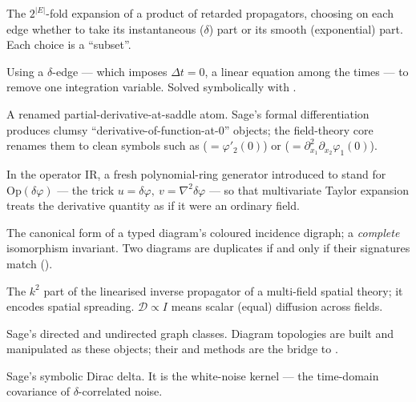 \begin{description}[leftmargin=0pt,style=nextline]
  \item[$\delta$-edge / smooth-edge subset] The $2^{|E|}$-fold expansion of a
        product of retarded propagators, choosing on each edge whether to take its
        instantaneous ($\delta$) part or its smooth (exponential) part. Each choice
        is a ``subset''.

  \item[$\delta$-elimination] Using a $\delta$-edge --- which imposes $\Delta t=0$,
        a linear equation among the times --- to remove one integration variable.
        Solved symbolically with .

  \item[Derivative symbol] A renamed partial-derivative-at-saddle atom. Sage's
        formal differentiation produces clumsy ``derivative-of-function-at-0''
        objects; the field-theory core renames them to clean symbols such as
         ($=\varphi'_2(0)$) or 
        ($=\partial^{2}_{x_1}\partial_{x_2}\varphi_1(0)$).

  \item[Derived generator] In the operator IR, a fresh polynomial-ring generator
        introduced to stand for $\mathrm{Op}(\delta\varphi)$ --- the trick
        $u=\delta\varphi,\ v=\nabla^{2}\delta\varphi$ --- so that multivariate
        Taylor expansion treats the derivative quantity as if it were an ordinary
        field.

  \item[\code{diagram\_signature}] The canonical form of a typed diagram's coloured
        incidence digraph; a \emph{complete} isomorphism invariant. Two diagrams are
        duplicates if and only if their signatures match
        ().

  \item[Diffusion matrix $\mathcal{D}$] The $k^{2}$ part of the linearised inverse
        propagator of a multi-field spatial theory; it encodes spatial spreading.
        $\mathcal{D}\propto I$ means scalar (equal) diffusion across fields.

  \item[\code{DiGraph} / \code{Graph}] Sage's directed and undirected graph classes.
        Diagram topologies are built and manipulated as these objects; their
         and  methods are the
        bridge to .

  \item[\code{dirac\_delta(tau)}] Sage's symbolic Dirac delta. It is the white-noise
        kernel --- the time-domain covariance of $\delta$-correlated noise.


\end{description}
